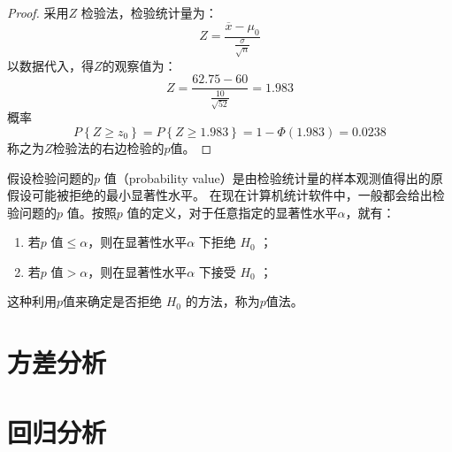 \documentclass[11pt]{book}
\newcounter{#2}
\newcounter{#2}[#1]
\numberwithin{#2}{#1}
\begin{document}
\begin{proof}
	采用$ Z $ 检验法，检验统计量为：
	\begin{equation*}
		Z=\frac{\overline{x} - \mu_0}{\frac{\sigma}{\sqrt{n}}}
	\end{equation*}
	以数据代入，得$Z$的观察值为：
	\begin{equation*}
		Z=\frac{62.75 - 60}{\frac{10}{\sqrt{52}}}=1.983
	\end{equation*}
	概率
	\begin{equation*}
		P\left\lbrace Z \ge z_0\right\rbrace =P\left\lbrace Z\ge1.983\right\rbrace =1-\Phi(1.983)=0.0238
	\end{equation*}
	称之为$Z$检验法的右边检验的$p$值。
\end{proof}
\begin{newdef}
	假设检验问题的$ p $ 值（probability value）是由检验统计量的样本观测值得出的原假设可能被拒绝的最小显著性水平。
	在现在计算机统计软件中，一般都会给出检验问题的$ p $ 值。按照$ p $ 值的定义，对于任意指定的显著性水平$ \alpha $，就有：
	
	\begin{enumerate}
		\item 若$ p $ 值$ \le \alpha $，则在显著性水平$ \alpha $ 下拒绝 $ H_0 $ ；
		\item 若$ p $ 值$ > \alpha $，则在显著性水平$ \alpha $ 下接受 $ H_0 $ ；
	\end{enumerate}
这种利用$p$值来确定是否拒绝 $ H_0 $ 的方法，称为$p$值法。
\end{newdef}


	\chapter{方差分析}
	\chapter{回归分析}
	
	
\end{document}
